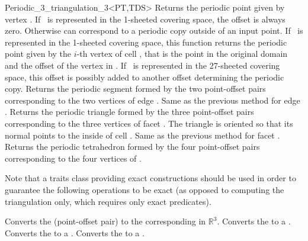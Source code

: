 \begin{ccRefClass}{Periodic_3_triangulation_3<PT,TDS>}
{Returns the periodic point given by vertex . If \ccVar\ is
  represented in the 1-sheeted covering space, the offset is always
  zero. Otherwise  can correspond to a periodic copy outside
   of an input point.}
\ccGlue
{}
{If \ccVar\ is represented in the 1-sheeted covering space, this function
  returns the periodic point given by the $i$-th vertex of cell
  , that is the point in the original domain and the offset of
  the vertex in .
  If \ccVar\ is represented in the 27-sheeted covering space,
  this offset is possibly added to another offset determining the periodic copy.
}
\ccGlue
{} 
{Returns the periodic segment formed by the two point-offset pairs
  corresponding to the two vertices of edge .
}
\ccGlue
{}
{Same as the previous method for edge .}
\ccGlue
{} 
{Returns the periodic triangle formed by the three point-offset pairs
  corresponding to the three vertices of facet
. The triangle is oriented so that its normal points to the
inside of cell .
}
\ccGlue
{}
{Same as the previous method for facet .}
\ccGlue
{}
{Returns the periodic tetrahedron formed by the four point-offset pairs
  corresponding to the four vertices of .}

Note that a traits class providing exact constructions should be used
in order to guarantee the following operations to be exact (as opposed
to computing the triangulation only, which requires only exact
predicates).

{Converts the   (point-offset pair) to the
  corresponding  in $\mathbb R^3$.}
\ccGlue
{}
{Converts the   to a .}
\ccGlue
{}
{Converts the   to a .}
\ccGlue
{}
{Converts the   to a .}


\end{ccRefClass}
